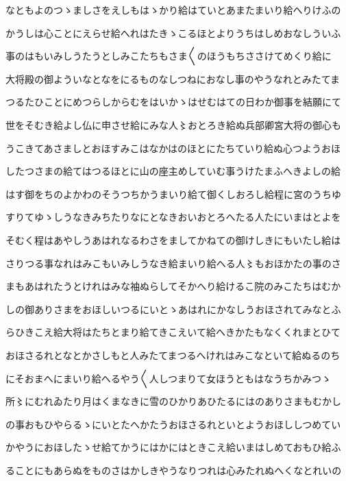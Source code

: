 \documentclass[a4paper,11pt,landscape]{ltjtarticle}
\begin{document}
\par\medskip
なともよのつゝましさをえしもはゝかり給はていとあまたまいり給へりけふの
\par\medskip
かうしは心ことにえらせ給へれはたきゝこるほとよりうちはしめおなしういふ
\par\medskip
事のはもいみしうたうとしみこたちもさま〱のほうもちささけてめくり給に
\par\medskip
大将殿の御よういなとなをにるものなしつねにおなし事のやうなれとみたてま
\par\medskip
つるたひことにめつらしからむをはいかゝはせむはての日わか御事を結願にて
\par\medskip
世をそむき給よし仏に申させ給にみな人〻おとろき給ぬ兵部卿宮大将の御心も
\par\medskip
うこきてあさましとおほすみこはなかはのほとにたちていり給ぬ心つようおほ
\par\medskip
したつさまの給てはつるほとに山の座主めしていむ事うけたまふへきよしの給
\par\medskip
はす御をちのよかわのそうつちかうまいり給て御くしおろし給程に宮のうちゆ
\par\medskip
すりてゆゝしうなきみちたりなにとなきおいおとろへたる人たにいまはとよを
\par\medskip
そむく程はあやしうあはれなるわさをましてかねての御けしきにもいたし給は
\par\medskip
さりつる事なれはみこもいみしうなき給まいり給へる人〻もおほかたの事のさ
\par\medskip
まもあはれたうとけれはみな袖ぬらしてそかへり給けるこ院のみこたちはむか
\par\medskip
しの御ありさまをおほしいつるにいとゝあはれにかなしうおほされてみなとふ
\par\medskip
らひきこえ給大将はたちとまり給てきこえいて給へきかたもなくくれまとひて
\par\medskip
おほさるれとなとかさしもと人みたてまつるへけれはみこなといて給ぬるのち
\par\medskip
にそおまへにまいり給へるやう〱人しつまりて女ほうともはなうちかみつゝ
\par\medskip
所〻にむれゐたり月はくまなきに雪のひかりあひたるにはのありさまもむかし
\par\medskip
の事おもひやらるゝにいとたへかたうおほさるれといとようおほししつめてい
\par\medskip
かやうにおほしたゝせ給てかうにはかにはときこえ給いまはしめておもひ給ふ
\par\medskip
ることにもあらぬをものさはかしきやうなりつれは心みたれぬへくなとれいの
\end{document}
